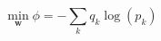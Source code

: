 \begin{equation}
    \min_{\mathbf{w}} \phi = - \sum_k q_k\log(p_k)
    \label{eq:training-problem}
\end{equation}

